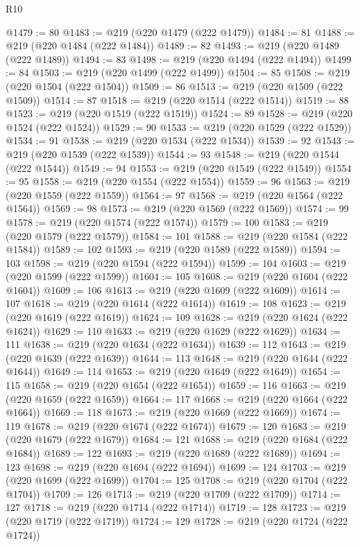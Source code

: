 \begin{lexlean}{R10}
\begin{coremodule}
{{{{{{{{{{{{{{{{{{{{{{{{{{{{{{{{{{{{{{{{{{{{{{{{{{{{{{{{{{{{{{{{{{{{{{{{{{{{{{{{{{{{{{{{{{{{{{{{{{{{{{{{{{{{@1479 := 80
@1483 := @219 (@220 @1479 (@222 @1479))
@1484 := 81
@1488 := @219 (@220 @1484 (@222 @1484))
@1489 := 82
@1493 := @219 (@220 @1489 (@222 @1489))
@1494 := 83
@1498 := @219 (@220 @1494 (@222 @1494))
@1499 := 84
@1503 := @219 (@220 @1499 (@222 @1499))
@1504 := 85
@1508 := @219 (@220 @1504 (@222 @1504))
@1509 := 86
@1513 := @219 (@220 @1509 (@222 @1509))
@1514 := 87
@1518 := @219 (@220 @1514 (@222 @1514))
@1519 := 88
@1523 := @219 (@220 @1519 (@222 @1519))
@1524 := 89
@1528 := @219 (@220 @1524 (@222 @1524))
@1529 := 90
@1533 := @219 (@220 @1529 (@222 @1529))
@1534 := 91
@1538 := @219 (@220 @1534 (@222 @1534))
@1539 := 92
@1543 := @219 (@220 @1539 (@222 @1539))
@1544 := 93
@1548 := @219 (@220 @1544 (@222 @1544))
@1549 := 94
@1553 := @219 (@220 @1549 (@222 @1549))
@1554 := 95
@1558 := @219 (@220 @1554 (@222 @1554))
@1559 := 96
@1563 := @219 (@220 @1559 (@222 @1559))
@1564 := 97
@1568 := @219 (@220 @1564 (@222 @1564))
@1569 := 98
@1573 := @219 (@220 @1569 (@222 @1569))
@1574 := 99
@1578 := @219 (@220 @1574 (@222 @1574))
@1579 := 100
@1583 := @219 (@220 @1579 (@222 @1579))
@1584 := 101
@1588 := @219 (@220 @1584 (@222 @1584))
@1589 := 102
@1593 := @219 (@220 @1589 (@222 @1589))
@1594 := 103
@1598 := @219 (@220 @1594 (@222 @1594))
@1599 := 104
@1603 := @219 (@220 @1599 (@222 @1599))
@1604 := 105
@1608 := @219 (@220 @1604 (@222 @1604))
@1609 := 106
@1613 := @219 (@220 @1609 (@222 @1609))
@1614 := 107
@1618 := @219 (@220 @1614 (@222 @1614))
@1619 := 108
@1623 := @219 (@220 @1619 (@222 @1619))
@1624 := 109
@1628 := @219 (@220 @1624 (@222 @1624))
@1629 := 110
@1633 := @219 (@220 @1629 (@222 @1629))
@1634 := 111
@1638 := @219 (@220 @1634 (@222 @1634))
@1639 := 112
@1643 := @219 (@220 @1639 (@222 @1639))
@1644 := 113
@1648 := @219 (@220 @1644 (@222 @1644))
@1649 := 114
@1653 := @219 (@220 @1649 (@222 @1649))
@1654 := 115
@1658 := @219 (@220 @1654 (@222 @1654))
@1659 := 116
@1663 := @219 (@220 @1659 (@222 @1659))
@1664 := 117
@1668 := @219 (@220 @1664 (@222 @1664))
@1669 := 118
@1673 := @219 (@220 @1669 (@222 @1669))
@1674 := 119
@1678 := @219 (@220 @1674 (@222 @1674))
@1679 := 120
@1683 := @219 (@220 @1679 (@222 @1679))
@1684 := 121
@1688 := @219 (@220 @1684 (@222 @1684))
@1689 := 122
@1693 := @219 (@220 @1689 (@222 @1689))
@1694 := 123
@1698 := @219 (@220 @1694 (@222 @1694))
@1699 := 124
@1703 := @219 (@220 @1699 (@222 @1699))
@1704 := 125
@1708 := @219 (@220 @1704 (@222 @1704))
@1709 := 126
@1713 := @219 (@220 @1709 (@222 @1709))
@1714 := 127
@1718 := @219 (@220 @1714 (@222 @1714))
@1719 := 128
@1723 := @219 (@220 @1719 (@222 @1719))
@1724 := 129
@1728 := @219 (@220 @1724 (@222 @1724))
}}}}}}}}}}}}}}}}}}}}}}}}}}}}}}}}}}}}}}}}}}}}}}}}}}}}}}}}}}}}}}}}}}}}}}}}}}}}}}}}}}}}}}}}}}}}}}}}}}}}}}}}}}}}
\end{coremodule}
\end{lexlean}

